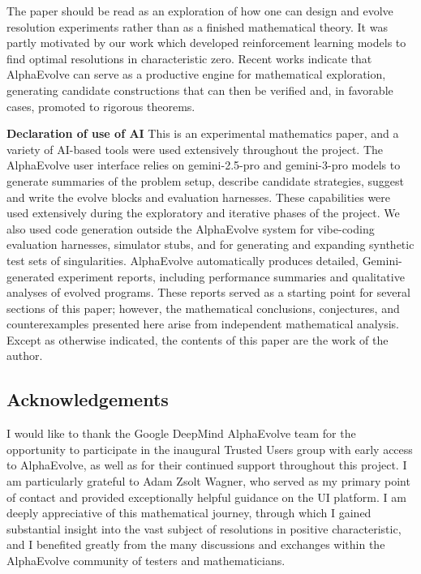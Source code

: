 \documentclass[11pt]{amsart}
\begin{document}
The paper should be read as an exploration of how one can design and evolve resolution experiments rather than as a finished mathematical theory. It was partly motivated by our work \cite{BercziFanZeng} which developed reinforcement learning models to find optimal resolutions in characteristic zero.  Recent works \cite{AEBruhat,AlphaEvolve2025Scale} indicate that AlphaEvolve can serve as a productive engine for mathematical exploration, generating candidate constructions that can then be verified and, in favorable cases, promoted to rigorous theorems.



\noindent \textbf{Declaration of use of AI}
This is an experimental mathematics paper, and a variety of AI-based tools were used extensively throughout the project. The AlphaEvolve user interface relies on gemini-2.5-pro and gemini-3-pro models to generate summaries of the problem setup, describe candidate strategies, suggest and write the evolve blocks and evaluation harnesses. These capabilities were used extensively during the exploratory and iterative phases of the project. We also used code generation outside the AlphaEvolve system for vibe-coding evaluation harnesses, simulator stubs, and for generating and expanding synthetic test sets of singularities. AlphaEvolve automatically produces detailed, Gemini-generated experiment reports, including performance summaries and qualitative analyses of evolved programs. These reports served as a starting point for several sections of this paper; however, the mathematical conclusions, conjectures, and counterexamples presented here arise from independent mathematical analysis. Except as otherwise indicated, the contents of this paper are the work of the author.


\subsection*{Acknowledgements}
I would like to thank the Google DeepMind AlphaEvolve team for the opportunity to participate in the inaugural Trusted Users group with early access to AlphaEvolve, as well as for their continued support throughout this project. I am particularly grateful to Adam Zsolt Wagner, who served as my primary point of contact and provided exceptionally helpful guidance on the UI platform. I am deeply appreciative of this mathematical journey, through which I gained substantial insight into the vast subject of resolutions in positive characteristic, and I benefited greatly from the many discussions and exchanges within the AlphaEvolve community of testers and mathematicians.
\end{document}
